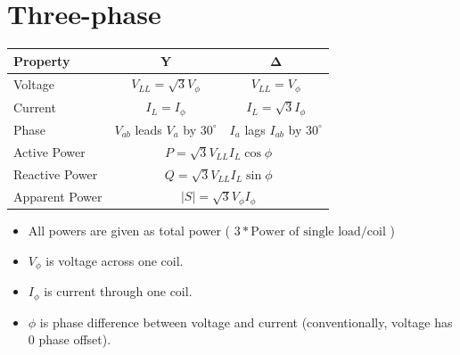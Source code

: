 \documentclass[12pt]{article}
\begin{document}
\section{Three-phase}
\begin{center}
		\begin{tabular}{|lcc|}
			\hline
			\bf Property & \bf Y & $ \pmb \Delta $ \\\hline
			Voltage&
			$ V_{LL} = \sqrt{3}V_\phi $ & 
			$ V_{LL} = V_\phi $ \\
			Current&
			$ I_L = I_\phi $ &
			$ I_L = \sqrt{3} I_\phi $ \\
			Phase&
			$ V_{ab} $ leads $ V_a $ by $30 ^\circ $ &
			$ I_{a} $ lags $ I_{ab} $ by $30 ^\circ $ \\
			Active Power &
			\multicolumn{2}{c|}{
				$ P = \sqrt{3}V_{LL}I_L \cos \phi $
			} \\
			Reactive Power &
			\multicolumn{2}{c|}{
				$ Q = \sqrt{3}V_{LL}I_L \sin \phi $
			} \\
			Apparent Power &
			\multicolumn{2}{c|}{
				$ |S| = \sqrt{3}V_\phi I_\phi $
			} \\
			\hline
		\end{tabular}
		\begin{itemize}
			\item All powers are given as total power
				( $ 3 * \text{Power of single load/coil}  $ )
			\item
				$ V_\phi $ is voltage across one coil.
			\item
				$ I_\phi $ is current through one coil.
			\item 
				$ \phi $  is phase difference between voltage and current
			(conventionally, voltage has 0 phase offset).
		\end{itemize}
\end{center}
\end{document}
